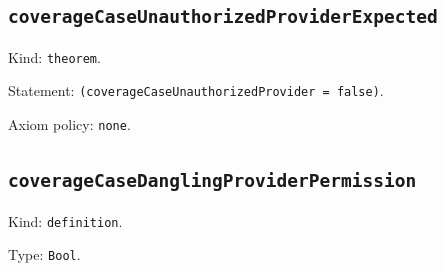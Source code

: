 \documentclass[11pt]{article}
\begin{document}
\subsection*{\texttt{coverageCaseUnauthorizedProviderExpected}}
\noindent Kind: \texttt{theorem}.\par
\noindent Statement: \texttt{(coverageCaseUnauthorizedProvider = false)}.\par
\noindent Axiom policy: \texttt{none}.\par
\subsection*{\texttt{coverageCaseDanglingProviderPermission}}
\noindent Kind: \texttt{definition}.\par
\noindent Type: \texttt{Bool}.\par
\end{document}
